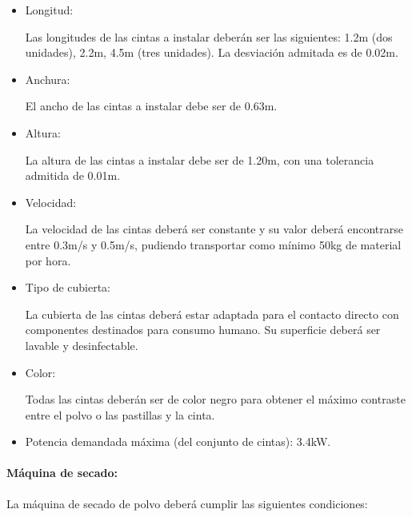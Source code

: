 		\begin{itemize}
			\item{Longitud:}\
			
			Las longitudes de las cintas a instalar deberán ser las siguientes: 1.2m (dos unidades), 2.2m, 4.5m (tres unidades). La desviación admitada es de 0.02m.  

			\item{Anchura:}\
			
			El ancho de las cintas a instalar debe ser de 0.63m.

			\item{Altura:}\
			
			La altura de las cintas a instalar debe ser de 1.20m, con una tolerancia admitida de 0.01m.
			
			\item{Velocidad:}\
			
			La velocidad de las cintas deberá ser constante y su valor deberá encontrarse entre 0.3m/s y 0.5m/s, pudiendo transportar como mínimo 50kg de material por hora. 
			
			\item{Tipo de cubierta: }\
			
			La cubierta de las cintas deberá estar adaptada para el contacto directo con componentes destinados para consumo humano. Su superficie deberá ser lavable y desinfectable.

			\item{Color: }\
			
			Todas las cintas deberán ser de color negro para obtener el máximo contraste entre el polvo o las pastillas y la cinta.

			\item{Potencia demandada máxima (del conjunto de cintas):} 3.4kW.
		
		\end{itemize}

\paragraph{Máquina de secado:}
		La máquina de secado de polvo deberá cumplir las siguientes condiciones:
		
